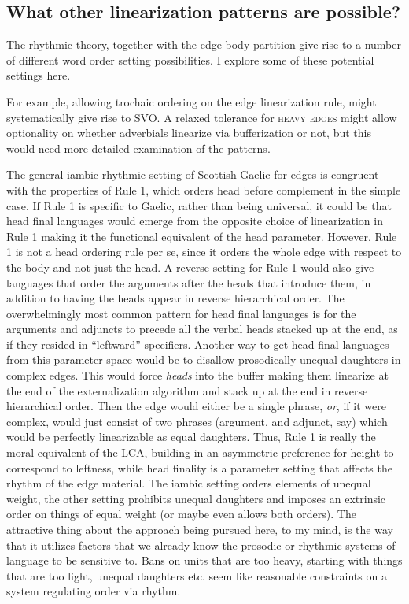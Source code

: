 \documentclass[output=paper,colorlinks,citecolor=brown]{langscibook}
\begin{document}
\subsection{What other linearization patterns are possible?}

The rhythmic theory, together with the edge body partition give rise to a number of different word order setting possibilities. I explore some of these potential settings here. 

For example, allowing trochaic ordering on the edge linearization rule, might systematically give rise to SVO. A relaxed tolerance for \textsc{heavy edges} might allow optionality on whether adverbials linearize via bufferization or not, but this would need more detailed examination of the patterns.

The general iambic rhythmic setting of Scottish Gaelic for edges is congruent with the properties of Rule 1, which orders head before complement in the simple case. If Rule 1 is specific to Gaelic, rather than being universal, it could be that head final languages would emerge from the opposite choice of linearization in Rule 1 making it the functional equivalent of the head parameter. However, Rule 1 is not a head ordering rule per se, since it orders the whole edge with respect to the body and not just the head. A reverse setting for Rule 1 would also give languages that order the arguments after the heads that introduce them, in addition to having the heads appear in reverse hierarchical order. The overwhelmingly most common pattern for head final languages is for the arguments and adjuncts to precede all the verbal heads stacked up at the end, as if they resided in ``leftward'' specifiers.  Another way to get head final languages from this parameter space would be to disallow prosodically unequal daughters in complex edges. This would force \textit{heads} into the buffer making them linearize at the end of the externalization algorithm and stack up at the end in reverse hierarchical order.  Then the edge would either be a single phrase, \textit{or}, if it were complex, would just consist of two phrases (argument, and adjunct, say) which would be perfectly linearizable as equal daughters. Thus, Rule 1 is really the moral equivalent of the LCA, building in an asymmetric preference for height to correspond to leftness, while head finality is a parameter setting that affects the rhythm of the edge material. The iambic setting orders elements of unequal weight, the other setting prohibits unequal daughters and  imposes an extrinsic order on things of equal weight (or maybe even allows both orders). The attractive thing about the approach being pursued here, to my mind, is the way that it utilizes factors that we already know the prosodic or rhythmic systems of language to be sensitive to. Bans on units that are too heavy, starting with things that are too light, unequal daughters etc. seem like reasonable constraints on a system regulating order via rhythm. 
\end{document}
